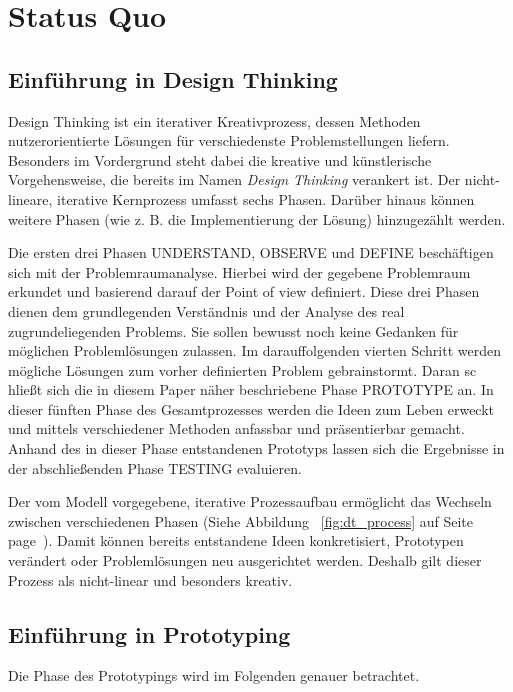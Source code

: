 \section{Status Quo}\label{sec:statusQuo}

\subsection{Einführung in Design Thinking}

Design Thinking ist ein iterativer Kreativprozess, dessen Methoden nutzerorientierte Lösungen für verschiedenste Problemstellungen liefern. Besonders im Vordergrund steht dabei die kreative und künstlerische Vorgehensweise, die bereits im Namen \textit{Design Thinking} verankert ist. Der nicht-lineare, iterative Kernprozess umfasst sechs Phasen. Darüber hinaus können weitere Phasen (wie z. B. die Implementierung der Lösung) hinzugezählt werden.

Die ersten drei Phasen UNDERSTAND, OBSERVE und DEFINE beschäftigen sich mit der Problemraumanalyse. Hierbei wird der gegebene Problemraum erkundet und basierend darauf der Point of view definiert. Diese drei Phasen dienen dem grundlegenden Verständnis und der Analyse des real zugrundeliegenden Problems. Sie sollen bewusst noch keine Gedanken für möglichen Problemlösungen zulassen. Im darauffolgenden vierten Schritt werden mögliche Lösungen zum vorher definierten Problem gebrainstormt. Daran sc  hließt sich die in diesem Paper näher beschriebene Phase PROTOTYPE an. In dieser fünften Phase des Gesamtprozesses werden die Ideen zum Leben erweckt und mittels verschiedener Methoden anfassbar und präsentierbar gemacht. Anhand des in dieser Phase entstandenen Prototyps lassen sich die Ergebnisse in der abschließenden Phase TESTING evaluieren. 


Der vom Modell vorgegebene, iterative Prozessaufbau ermöglicht das Wechseln zwischen verschiedenen Phasen  (Siehe Abbildung ~\ref{fig:dt_process} auf Seite page~\pageref{fig:dt_process}). Damit können bereits entstandene Ideen konkretisiert, Prototypen verändert oder Problemlösungen neu ausgerichtet werden. Deshalb gilt dieser Prozess als nicht-linear und besonders kreativ.

\subsection{Einführung in Prototyping}

Die Phase des Prototypings wird im Folgenden genauer betrachtet.


